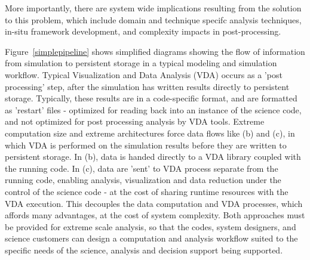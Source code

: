 More importantly, there are system wide implications resulting from the solution
to this problem, which include domain and technique specifc analysis techniques,
in-situ framework development, and complexity impacts in post-processing.

Figure~\ref{simplepipeline} shows simplified diagrams showing the flow of information from simulation to persistent storage in a typical modeling and simulation workflow.  Typical Visualization and Data Analysis (VDA) occurs as a 'post processing' step, after the simulation has written results directly to persistent storage.  Typically, these results are in a code-specific format, and are formatted as 'restart' files - optimized for reading back into an instance of the science code, and not optimized for post processing analysis by VDA tools.  Extreme computation size and extreme architectures force data flows like (b) and (c), in which VDA is performed on the simulation results before they are written to persistent storage.  In (b), data is handed directly to a VDA library coupled with the running code.  In (c), data are 'sent' to VDA process separate from the running code, enabling analysis, visualization and data reduction under the control of the science code - at the cost of sharing runtime resources with the VDA execution.  This decouples the data computation and VDA processes, which affords many advantages, at the cost of system complexity.  Both approaches must be provided for extreme scale analysis, so that the codes, system designers, and science customers can design a computation and analysis workflow suited to the specific needs of the science, analysis and decision support being supported.
